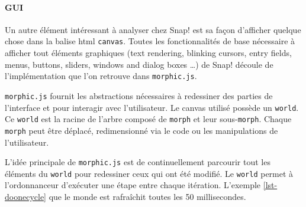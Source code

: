 % 
% 
% 

\paragraph{GUI}
Un autre élément intéressant à analyser chez Snap! est sa façon d'afficher quelque chose dans la balise html \texttt{canvas}. Toutes les fonctionnalités de base nécessaire à afficher tout éléments graphiques (text rendering, blinking cursors, entry fields, menus, buttons, sliders, windows and dialog boxes \ldots) de Snap! découle de l'implémentation que l'on retrouve dans \texttt{morphic.js}.

\texttt{morphic.js} fournit les abstractions nécessaires à redessiner des parties de l'interface et pour interagir avec l'utilisateur. Le canvas utilisé possède un \texttt{world}. Ce \texttt{world} est la racine de l'arbre composé de \texttt{morph} et leur sous-\texttt{morph}. Chaque \texttt{morph} peut être déplacé, redimensionné via le code ou les manipulations de l'utilisateur.

L'idée principale de \texttt{morphic.js} est de continuellement parcourir tout les éléments du \texttt{world} pour redessiner ceux qui ont été modifié. Le \texttt{world} permet à l'ordonnanceur d'exécuter une étape entre chaque itération. L'exemple \ref{lst-doonecycle} que le monde est rafraîchit toutes les 50 millisecondes.

